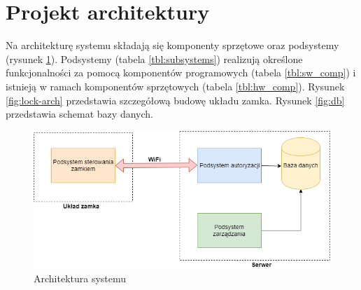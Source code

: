     \vspace{10mm}

        \section{Projekt architektury}

            Na architekturę systemu składają się komponenty sprzętowe oraz podsystemy (rysunek \ref{fig:hl-arch}). Podsystemy (tabela \ref{tbl:subsystems}) realizują określone funkcjonalności za pomocą komponentów programowych (tabela \ref{tbl:sw_comp}) i istnieją w ramach komponentów sprzętowych (tabela \ref{tbl:hw_comp}). Rysunek \ref{fig:lock-arch} przedstawia szczegółową budowę układu zamka. Rysunek \ref{fig:db} przedstawia schemat bazy danych.

            \vspace{10mm}
            \begin{figure}[]
                \includegraphics[width=\linewidth]{chapters/images/hl-arch3.png}
                \caption{Architektura systemu}
                \label{fig:hl-arch}
            \end{figure}

